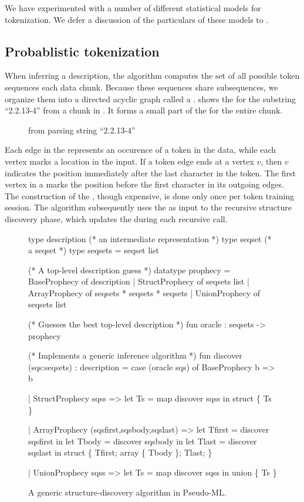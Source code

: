 We have experimented with a number of different statistical models for
tokenization.  We defer a discussion of the particulars of these
models to .

\subsection{Probablistic tokenization}

When inferring a description, the algorithm computes the set of all
possible token sequences each data chunk.  Because these sequences
share subsequences, we organize them into a directed acyclic graph
called a \seqset{}.  shows the \seqset{} for the
substring ``2.2.13-4'' from a chunk in . It forms a
small part of the \seqset{} for the entire chunk.

\begin{figure}[th]
\begin{center}
\end{center}
\caption{\seqset{} from parsing string ``2.2.13-4''}\label{fig:seqset}
\end{figure}
\noindent
Each edge in the \seqset{} represents an occurence of a token in the
data, while each vertex marks a location in the input.  If a token
edge ends at a vertex $v$, then $v$ indicates the position immediately
after the last character in the token.  The first vertex in a
\seqset{} marks the position before the first character in its
outgoing edges. 
The construction of the \seqset, though expensive, is done only once
per token training session.  The algorithm subsequently uses the
\seqset{} as input to the recursive structure discovery phase, which
updates the \seqset{} during each recursive call.

\begin{figure}[t]
\begin{centercode}
type description (* an intermediate representation *)
type seqset       (* a seqset *)
type seqsets = seqset list

(* A top-level description guess *)
datatype prophecy =
   BaseProphecy   of description
 | StructProphecy of seqsets list 
 | ArrayProphecy  of seqsets * seqsets * seqsets
 | UnionProphecy  of seqsets list

(* Guesses the best top-level description *)
fun oracle : seqsets -> prophecy

(* Implements a generic inference algorithm *)
fun discover (sqs:seqsets) : description =
 case (oracle sqs) of
   BaseProphecy b => b

 | StructProphecy sqss => 
     let Ts = map discover sqss in
     struct \{ Ts \}

 | ArrayProphecy (sqsfirst,sqsbody,sqslast) => 
     let Tfirst = discover sqsfirst in
     let Tbody  = discover sqsbody  in
     let Tlast  = discover sqslast  in
     struct \{ Tfirst; array \{ Tbody \}; Tlast; \}

 | UnionProphecy sqss => 
     let Ts = map discover sqss in
     union \{ Ts \}
\end{centercode}
\caption{A generic structure-discovery algorithm in Pseudo-ML.} 
\label{fig:structure-discovery}
\end{figure}

